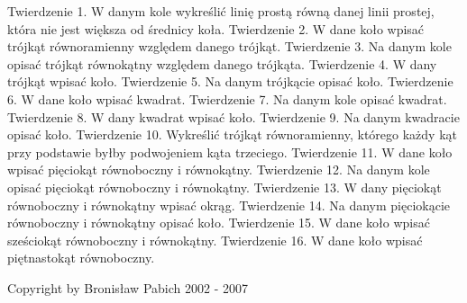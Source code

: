 Twierdzenie 1.
    W danym kole wykreślić linię prostą równą danej linii prostej, która nie jest większa od średnicy koła.
Twierdzenie 2.
    W dane koło wpisać trójkąt równoramienny względem danego trójkąt.
Twierdzenie 3.
    Na danym kole opisać trójkąt równokątny względem danego trójkąta.
Twierdzenie 4.
    W dany trójkąt wpisać koło.
Twierdzenie 5.
    Na danym trójkącie opisać koło.
Twierdzenie 6.
    W dane koło wpisać kwadrat.
Twierdzenie 7.
    Na danym kole opisać kwadrat.
Twierdzenie 8.
    W dany kwadrat wpisać koło.
Twierdzenie 9.
    Na danym kwadracie opisać koło.
Twierdzenie 10.
    Wykreślić trójkąt równoramienny, którego każdy kąt przy podstawie byłby podwojeniem kąta trzeciego.
Twierdzenie 11.
    W dane koło wpisać pięciokąt równoboczny i równokątny.
Twierdzenie 12.
    Na danym kole opisać pięciokąt równoboczny i równokątny.
Twierdzenie 13.
    W dany pięciokąt równoboczny i równokątny wpisać okrąg.
Twierdzenie 14.
    Na danym pięciokącie równoboczny i równokątny opisać koło.
Twierdzenie 15.
    W dane koło wpisać sześciokąt równoboczny i równokątny.
Twierdzenie 16.
    W dane koło wpisać piętnastokąt równoboczny. 

    Copyright by Bronisław Pabich 2002 - 2007